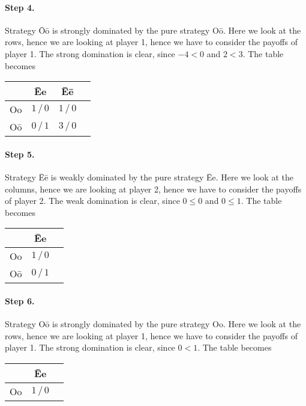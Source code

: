 \begin{enumerate}[label=\alph*.]
	      \paragraph{Step 4.} Strategy \=O\=o is strongly dominated by the pure strategy O\=o. Here we look at the rows, hence we are looking at player 1, hence we have to consider the payoffs of player 1. The strong domination is clear, since $-4 < 0$ and $2 < 3$.
	      The table becomes

	      \begin{table}[h]
	      	\centering
	      	\begin{tabular}{c|ccc}
	      		     & \=Ee         & \=E\=e       \\ \hline
	      		Oo   & $1\, / \, 0$ & $1\, / \, 0$ \\
	      		O\=o & $0\, / \, 1$ & $3\, / \, 0$
	      	\end{tabular}
	      \end{table}

	      \paragraph{Step 5.} Strategy \=E\=e is weakly dominated by the pure strategy \=Ee. Here we look at the columns, hence we are looking at player 2, hence we have to consider the payoffs of player 2. The weak domination is clear, since $0 \leq 0$ and $0 \leq 1$.
	      The table becomes

	      \begin{table}[h]
	      	\centering
	      	\begin{tabular}{c|cc}
	      		     & \=Ee         \\ \hline
	      		Oo   & $1\, / \, 0$ \\
	      		O\=o & $0\, / \, 1$
	      	\end{tabular}
	      \end{table}

	      \paragraph{Step 6.} Strategy O\=o is strongly dominated by the pure strategy Oo. Here we look at the rows, hence we are looking at player 1, hence we have to consider the payoffs of player 1. The strong domination is clear, since $0 < 1$.
	      The table becomes

	      \begin{table}[h!]
	      	\centering
	      	\begin{tabular}{c|cc}
	      		   & \=Ee         \\ \hline
	      		Oo & $1\, / \, 0$
	      	\end{tabular}
	      \end{table}


\end{enumerate}

